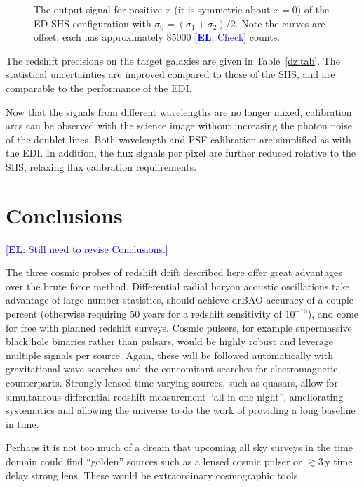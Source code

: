 \documentclass[preprint2, 10pt]{aastex}
\newcommand{\eric}[1]{\textcolor{blue}{[{\bf EL}: #1]}}
\begin{document}
\begin{figure}[t]
   \centering
   \caption{The output signal for positive $x$ (it is symmetric about
$x=0$) of the ED-SHS configuration with 
    $\sigma_0=(\sigma_1+\sigma_2)/2$. 
Note the curves are offset; each has approximately 85000 \eric{Check} counts. 
\label{edshs:fig}}
\end{figure} 


The redshift precisions on the target galaxies are given in Table~\ref{dz:tab}.  The statistical uncertainties are improved compared to those of the
SHS, and are comparable to the performance of the EDI.

Now that the signals from different wavelengths are no longer mixed, calibration arcs can be observed with the science image without increasing
the photon noise of the doublet lines.  Both wavelength and PSF calibration are simplified as with the EDI.
In addition, the flux signals per pixel are further reduced relative to the SHS, relaxing flux calibration requiirements. 


\section{Conclusions} \label{sec:concl} 

\eric{Still need to revise Conclusions.} 

The three cosmic probes of redshift drift described here offer great 
advantages over the brute force method.  Differential radial baryon acoustic 
oscillations take advantage of large number statistics, should achieve drBAO 
accuracy of a couple percent (otherwise requiring 50 years for a redshift 
sensitivity of $10^{-10}$), and come for free with planned redshift surveys. 
Cosmic pulsers, for example supermassive black hole binaries rather than 
pulsars, would be highly robust and leverage multiple signals per source.  
Again, these will be followed automatically with gravitational wave 
searches and the concomitant searches for electromagnetic counterparts.  
Strongly lensed time varying sources, such as quasars, allow for simultaneous 
differential redshift measurement ``all in one night'', ameliorating 
systematics and allowing the universe to do the work of providing a long 
baseline in time.  

Perhaps it is not too much of a dream that upcoming all sky surveys in the 
time domain could find ``golden'' sources such as a lensed cosmic pulser 
or $\gtrsim3\,$y time delay strong lens.  These would be extraordinary 
cosmographic tools. 
\end{document}
